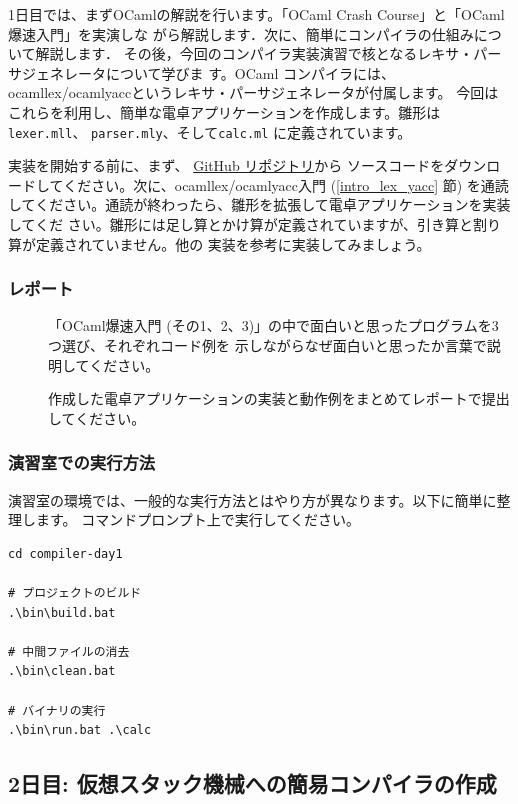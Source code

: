 \documentclass[a4paper,11pt]{jsarticle}
\begin{document}
1日目では、まずOCamlの解説を行います。「OCaml Crash Course」と「OCaml爆速入門」を実演しな
がら解説します．次に、簡単にコンパイラの仕組みについて解説します．
その後，今回のコンパイラ実装演習で核となるレキサ・パーサジェネレータについて学びま
す。OCaml コンパイラには、ocamllex/ocamlyaccというレキサ・パーサジェネレータが付属します。
今回はこれらを利用し、簡単な電卓アプリケーションを作成します。雛形は \verb|lexer.mll|、
\verb|parser.mly|、そして\verb|calc.ml| に定義されています。

実装を開始する前に、まず、
\href{https://github.com/tmu-compiler-info-sys-exp-I/compiler-day1}{GitHub リポジトリ}から
ソースコードをダウンロードしてください。次に、ocamllex/ocamlyacc入門 (\ref{intro_lex_yacc}
節) を通読してください。通読が終わったら、雛形を拡張して電卓アプリケーションを実装してくだ
さい。雛形には足し算とかけ算が定義されていますが、引き算と割り算が定義されていません。他の
実装を参考に実装してみましょう。

\subsubsection{レポート}

\begin{description}
\item []
  「OCaml爆速入門 (その1、2、3)」の中で面白いと思ったプログラムを3つ選び、それぞれコード例を
示しながらなぜ面白いと思ったか言葉で説明してください。
\item []
  作成した電卓アプリケーションの実装と動作例をまとめてレポートで提出してください。
\end{description}

\subsubsection{演習室での実行方法}

演習室の環境では、一般的な実行方法とはやり方が異なります。以下に簡単に整理します。
コマンドプロンプト上で実行してください。

\begin{lstlisting}
cd compiler-day1

# プロジェクトのビルド
.\bin\build.bat

# 中間ファイルの消去
.\bin\clean.bat

# バイナリの実行
.\bin\run.bat .\calc
\end{lstlisting}

\subsection{2日目: 仮想スタック機械への簡易コンパイラの作成}
\end{document}
